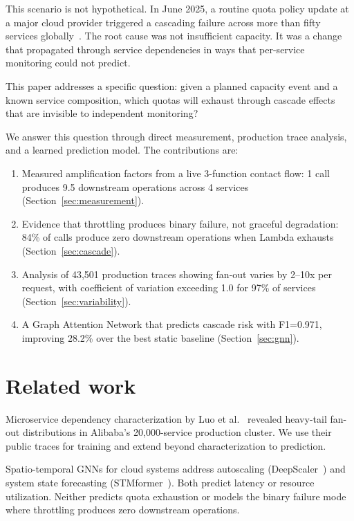 \documentclass{article}
\begin{document}
This scenario is not hypothetical. In June 2025, a routine quota policy update at a major cloud provider triggered a cascading failure across more than fifty services globally~\citep{catchpoint2025}. The root cause was not insufficient capacity. It was a change that propagated through service dependencies in ways that per-service monitoring could not predict.

This paper addresses a specific question: given a planned capacity event and a known service composition, which quotas will exhaust through cascade effects that are invisible to independent monitoring?

We answer this question through direct measurement, production trace analysis, and a learned prediction model. The contributions are:

\begin{enumerate}
  \item Measured amplification factors from a live 3-function contact flow: 1 call produces 9.5 downstream operations across 4 services (Section~\ref{sec:measurement}).
  \item Evidence that throttling produces binary failure, not graceful degradation: 84\% of calls produce zero downstream operations when Lambda exhausts (Section~\ref{sec:cascade}).
  \item Analysis of 43,501 production traces showing fan-out varies by 2--10x per request, with coefficient of variation exceeding 1.0 for 97\% of services (Section~\ref{sec:variability}).
  \item A Graph Attention Network that predicts cascade risk with F1=0.971, improving 28.2\% over the best static baseline (Section~\ref{sec:gnn}).
\end{enumerate}

\section{Related work}

Microservice dependency characterization by Luo et al.~\citep{luo2021} revealed heavy-tail fan-out distributions in Alibaba's 20,000-service production cluster. We use their public traces for training and extend beyond characterization to prediction.

Spatio-temporal GNNs for cloud systems address autoscaling (DeepScaler~\citep{deepscaler2023}) and system state forecasting (STMformer~\citep{stmformer2024}). Both predict latency or resource utilization. Neither predicts quota exhaustion or models the binary failure mode where throttling produces zero downstream operations.
\end{document}
